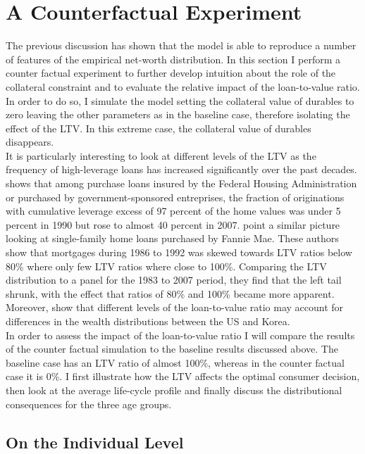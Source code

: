 \documentclass[12pt,a4paper,leqno]{article}
\theoremstyle{definition}
\begin{document}
\section{A Counterfactual Experiment}
The previous discussion has shown that the model is able to reproduce a number of features of the empirical net-worth distribution. In this section I perform a counter factual experiment to further develop intuition about the role of the collateral constraint and to evaluate the relative impact of the loan-to-value ratio. In order to do so, I simulate the model setting the collateral value of durables to zero leaving the other parameters as in the baseline case, therefore isolating the effect of the LTV. In this extreme case, the collateral value of durables disappears.\\
It is particularly interesting to look at different levels of the LTV as the frequency of high-leverage loans has increased significantly over the past decades. \cite{pinto2010government} shows that among purchase loans insured by the Federal Housing Administration or purchased by government-sponsored entreprises, the fraction of originations with cumulative leverage excess of 97 percent of the home values was under 5 percent in 1990 but rose to almost 40 percent in 2007. \cite{bokhari2013did} point a similar picture looking at single-family home loans purchased by Fannie Mae. These authors show that mortgages during 1986 to 1992 was skewed towards LTV ratios below 80\% where only few LTV ratios where close to 100\%. Comparing the LTV distribution to a panel for the 1983 to 2007 period, they find that the left tail shrunk, with the effect that ratios of 80\% and 100\% became more apparent. Moreover, \cite{cho2012accounting} show that different levels of the loan-to-value ratio  may account for differences in the wealth distributions between the US and Korea.\\
In order to assess the impact of the loan-to-value ratio I will compare the results of the counter factual simulation to the baseline results discussed above. The baseline case has an LTV ratio of almost 100\%, whereas in the counter factual case it is 0\%. I first illustrate how the LTV affects the optimal consumer decision, then look at the average life-cycle profile and finally discuss the distributional consequences for the three age groups.

\subsection{On the Individual Level}
\end{document}
